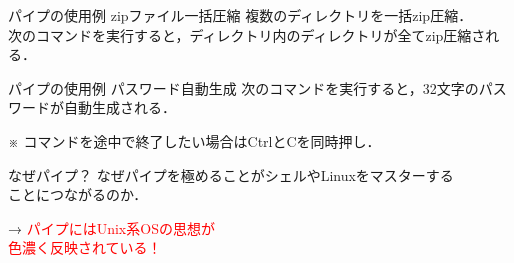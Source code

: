 \documentclass[uplatex, dvipdfmx, 12pt]{beamer}
\begin{document}
\begin{frame}{パイプの使用例 zipファイル一括圧縮}
  複数のディレクトリを一括zip圧縮．\\
  次のコマンドを実行すると，ディレクトリ内のディレクトリが全てzip圧縮される．

  \vspace{1em}
  \begin{tcolorbox}
    \lstzip
  \end{tcolorbox}

\end{frame}

\begin{frame}{パイプの使用例 パスワード自動生成}
  次のコマンドを実行すると，32文字のパスワードが自動生成される．
  
  \vspace{1em}
  \begin{tcolorbox}
    \lstpass
  \end{tcolorbox}
  ※ コマンドを途中で終了したい場合はCtrlとCを同時押し．
\end{frame}


\begin{frame}{なぜパイプ？}
  なぜパイプを極めることがシェルやLinuxをマスターする\\ことにつながるのか．

  \vspace{1em}
  \pause
  \begin{large}→ 
    \hspace{1em}\textcolor{red}{パイプにはUnix系OSの思想が\\\hspace{2em}色濃く反映されている！}
  \end{large}
\end{frame}
\end{document}
